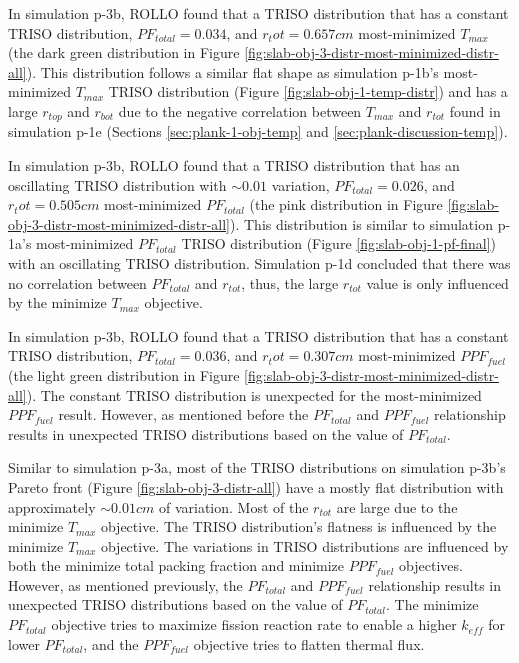 In simulation p-3b, \gls{ROLLO} found that a TRISO distribution that has a 
constant TRISO distribution, $PF_{total} = 0.034$, and $r_tot=0.657cm$ most-minimized 
$T_{max}$ (the dark green distribution in Figure 
\ref{fig:slab-obj-3-distr-most-minimized-distr-all}).
This distribution follows a similar flat shape as simulation p-1b's most-minimized 
$T_{max}$ TRISO distribution (Figure \ref{fig:slab-obj-1-temp-distr}) and has a large 
$r_{top}$ and $r_{bot}$ due to the negative correlation between $T_{max}$ and $r_{tot}$
found in simulation p-1e (Sections \ref{sec:plank-1-obj-temp} and 
\ref{sec:plank-discussion-temp}). 

In simulation p-3b, \gls{ROLLO} found that a TRISO distribution that has an 
oscillating TRISO distribution with $\sim0.01$ variation, $PF_{total} = 0.026$, and 
$r_tot=0.505cm$ most-minimized $PF_{total}$
(the pink distribution in Figure \ref{fig:slab-obj-3-distr-most-minimized-distr-all}).
This distribution is similar to simulation p-1a's most-minimized $PF_{total}$ TRISO 
distribution (Figure \ref{fig:slab-obj-1-pf-final}) with an oscillating TRISO 
distribution.
Simulation p-1d concluded that there was no correlation between $PF_{total}$ and $r_{tot}$, 
thus, the large $r_{tot}$ value is only influenced by the minimize $T_{max}$ objective. 

In simulation p-3b, \gls{ROLLO} found that a TRISO distribution that has a 
constant TRISO distribution, $PF_{total} = 0.036$, and $r_tot=0.307cm$ most-minimized 
$PPF_{fuel}$ (the light green distribution in Figure 
\ref{fig:slab-obj-3-distr-most-minimized-distr-all}).
The constant TRISO distribution is unexpected for the most-minimized $PPF_{fuel}$ result. 
However, as mentioned before the $PF_{total}$ and $PPF_{fuel}$ relationship
results in unexpected TRISO distributions based on the value of $PF_{total}$. 

Similar to simulation p-3a, most of the \gls{TRISO} distributions on simulation 
p-3b's Pareto front (Figure \ref{fig:slab-obj-3-distr-all}) have a mostly flat 
distribution with approximately $\sim0.01cm$ of variation. 
Most of the $r_{tot}$ are large due to the minimize $T_{max}$ objective. 
The TRISO distribution's flatness is influenced by the minimize $T_{max}$ objective. 
The variations in \gls{TRISO} distributions are influenced by both the minimize 
total packing fraction and minimize $PPF_{fuel}$ objectives. 
However, as mentioned previously, the $PF_{total}$ and $PPF_{fuel}$ relationship
results in unexpected TRISO distributions based on the value of $PF_{total}$. 
The minimize $PF_{total}$ objective tries to maximize fission reaction rate
to enable a higher $k_{eff}$ for lower $PF_{total}$, and 
the $PPF_{fuel}$ objective tries to flatten thermal flux. 

